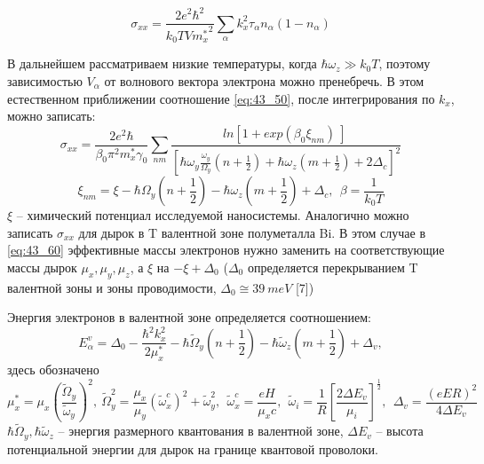 \begin{equation} \label{eq:43_50} 
{\sigma }_{xx}=\frac{2e^2{\hbar }^2}{k_0TV{m^*_x}^2}\sum_{\alpha }{k^2_x{\tau }_{\alpha }n_{\alpha }\left(1-n_{\alpha }\right)}
\end{equation}

В дальнейшем рассматриваем низкие температуры, когда $\hbar {\omega }_z\gg k_0T$, поэтому зависимостью $V_{\alpha }$ от волнового вектора электрона можно пренебречь. В этом естественном приближении соотношение \eqref{eq:43_50}, после интегрирования по $k_x$, можно записать:
\begin{equation} \label{eq:43_60}
{\sigma }_{xx}=\frac{2e^2\hbar }{{\beta }_0{\pi }^2m^*_x{\gamma }_0}\sum_{nm}{\frac{{ln \left[1+{exp \left({\beta }_0{\xi }_{nm}\right)\ }\right]\ }}{{\left[\hbar {\omega }_y\frac{{\omega }_y}{{\Omega }_y}\left(n+\frac{1}{2}\right)+\hbar {\omega }_z\left(m+\frac{1}{2}\right)+2{\Delta }_c\right]}^2}} 
\end{equation}
\[
{\xi }_{nm}=\xi -\hbar {\Omega }_y\left(n+\frac{1}{2}\right)-\hbar {\omega }_z\left(m+\frac{1}{2}\right)+{\Delta }_c,\ \ \beta =\frac{1}{k_0T}
\]
$\xi $ -- химический потенциал исследуемой наносистемы. Аналогично можно записать ${\sigma }_{xx}$ для дырок в T валентной зоне полуметалла Bi. В этом случае в \eqref{eq:43_60} эффективные массы электронов нужно заменить на соответствующие массы дырок ${\mu }_x,{\mu }_y,{\mu }_z$, а $\xi $  на $-\xi +{\Delta }_0$ (${\Delta }_0$ определяется перекрыванием T валентной зоны и зоны проводимости, ${\Delta }_0\cong 39\ meV$ [7]) 

Энергия электронов в валентной зоне определяется соотношением:
\[
E^v_{\alpha }={\Delta }_0-\frac{{\hbar }^2k^2_x}{2{\mu }^*_x}-\hbar {\widetilde{\Omega }}_y\left(n+\frac{1}{2}\right)-\hbar {\widetilde{\omega }}_z\left(m+\frac{1}{2}\right)+{\Delta }_v,
\] 
здесь обозначено
\[
{\mu }^*_x={\mu }_x{\left(\frac{{\widetilde{\Omega }}_y}{{\widetilde{\omega }}_y}\right)}^2,\ {\widetilde{\Omega }}^2_y=\frac{{\mu }_x}{{\mu }_y}{\left({\widetilde{\omega }}^c_x\right)}^2+{\widetilde{\omega }}^2_y,\ \ {\widetilde{\omega }}^c_x=\frac{eH}{{\mu }_xc},\ \ {\widetilde{\omega }}_i=\frac{1}{R}{\left[\frac{2\Delta E_v}{{\mu }_i}\right]}^{\frac{1}{2}},\ \ {\Delta }_v=\frac{{\left(eER\right)}^2}{4\Delta E_v}
\] 
$\hbar {\widetilde{\Omega }}_y, \hbar {\widetilde{\omega }}_z$ -- энергия размерного квантования в валентной зоне, $\Delta E_v$ -- высота потенциальной энергии для дырок на границе квантовой проволоки.

